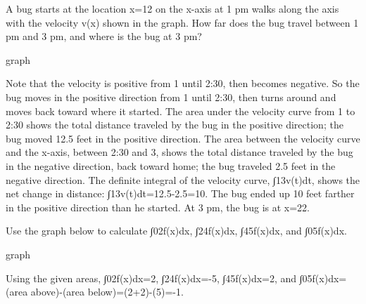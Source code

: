 \begin{example}
A bug starts at the location x=12 on the x-axis at 1 pm walks along the axis with the velocity v(x) shown in the graph. How far does the bug travel between 1 pm and 3 pm, and where is the bug at 3 pm?

graph
\begin{solution}
Note that the velocity is positive from 1 until 2:30, then becomes negative. So the bug moves in the positive direction from 1 until 2:30, then turns around and moves back toward where it started. The area under the velocity curve from 1 to 2:30 shows the total distance traveled by the bug in the positive direction; the bug moved 12.5 feet in the positive direction. The area between the velocity curve and the x-axis, between 2:30 and 3, shows the total distance traveled by the bug in the negative direction, back toward home; the bug traveled 2.5 feet in the negative direction. The definite integral of the velocity curve, ∫13v(t)dt, shows the net change in distance:
∫13v(t)dt=12.5-2.5=10.
The bug ended up 10 feet farther in the positive direction than he started. At 3 pm, the bug is at x=22.
\end{solution}\end{example}

\begin{example}
Use the graph below to calculate ∫02f(x)dx, ∫24f(x)dx, ∫45f(x)dx, and ∫05f(x)dx.

graph
\begin{solution} 
Using the given areas, ∫02f(x)dx=2, ∫24f(x)dx=-5, ∫45f(x)dx=2, and ∫05f(x)dx=(area above)-(area below)=(2+2)-(5)=-1.
\end{solution}\end{example}
